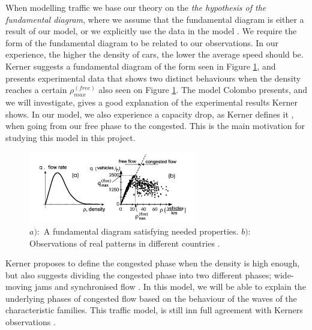 \documentclass[10pt]{article}
\numberwithin{equation}{section}
\begin{document}
When modelling traffic we base our theory on the \textit{the hypothesis of the fundamental diagram}, where we assume that the fundamental diagram is either a result of our model, or we explicitly use the data in the model \cite[p.~254]{KernerHelbing}. We require the form of the fundamental diagram to be related to our observations. In our experience, the higher the density of cars, the lower the average speed should be. Kerner suggests a fundamental diagram of the form seen in Figure \ref{fig:Kerner}, and presents experimental data that shows two distinct behaviours when the density reaches a certain $\rho_{max}^{(free)}$ also seen on Figure \ref{fig:Kerner}. The model Colombo presents, and we will investigate, gives a good explanation of the experimental results Kerner shows. In our model, we also experience a capacity drop, as Kerner defines it \cite[p.~254]{KernerHelbing}, when going from our free phase to the congested. This is the main motivation for studying this model in this project.
\begin{figure}[H]
    \centering
    \includegraphics[width=0.65\textwidth]{Figures/Model/Kerner.png}
    \caption{$a):$ A fundamental diagram satisfying needed properties. $b):$ Observations of real patterns in different countries \cite{KernerHelbing}. }
    \label{fig:Kerner}
\end{figure} Kerner proposes to define the congested phase when the density is high enough, but also suggests dividing the congested phase into two different phases; wide-moving jams and synchronised flow \cite[p.~256]{KernerHelbing}. In this model, we will be able to explain the underlying phases of congested flow based on the behaviour of the waves of the characteristic families. This traffic model, is still inn full agreement with Kerners observations \cite{Colombo2003}.
\end{document}
